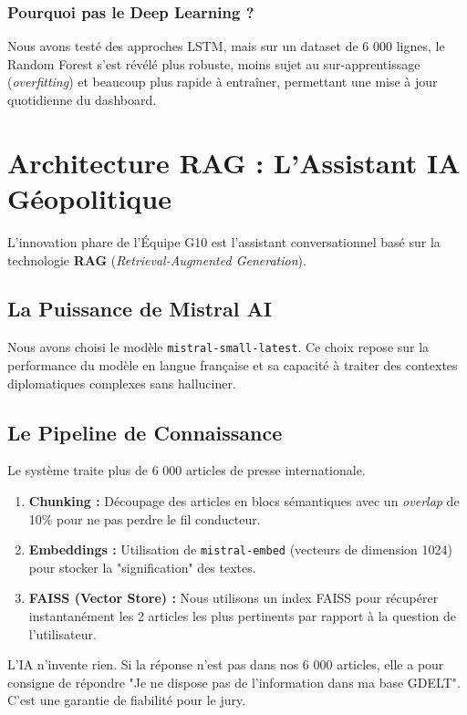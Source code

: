 \documentclass[12pt,a4paper]{article}
\begin{document}
\subsubsection{Pourquoi pas le Deep Learning ?}
Nous avons testé des approches LSTM, mais sur un dataset de 6 000 lignes, le Random Forest s'est révélé plus robuste, moins sujet au sur-apprentissage (\textit{overfitting}) et beaucoup plus rapide à entraîner, permettant une mise à jour quotidienne du dashboard.

\section{Architecture RAG : L'Assistant IA Géopolitique}
L'innovation phare de l'Équipe G10 est l'assistant conversationnel basé sur la technologie \textbf{RAG} (\textit{Retrieval-Augmented Generation}).

\subsection{La Puissance de Mistral AI}
Nous avons choisi le modèle \texttt{mistral-small-latest}. Ce choix repose sur la performance du modèle en langue française et sa capacité à traiter des contextes diplomatiques complexes sans halluciner. 

\subsection{Le Pipeline de Connaissance}
Le système traite plus de 6 000 articles de presse internationale. 
\begin{enumerate}
    \item \textbf{Chunking :} Découpage des articles en blocs sémantiques avec un \textit{overlap} de 10\% pour ne pas perdre le fil conducteur.
    \item \textbf{Embeddings :} Utilisation de \texttt{mistral-embed} (vecteurs de dimension 1024) pour stocker la "signification" des textes.
    \item \textbf{FAISS (Vector Store) :} Nous utilisons un index FAISS pour récupérer instantanément les 2 articles les plus pertinents par rapport à la question de l'utilisateur.
\end{enumerate}

\begin{tcolorbox}[colback=white, colframe=darkblue, title=Sécurité et Précision]
    L'IA n'invente rien. Si la réponse n'est pas dans nos 6 000 articles, elle a pour consigne de répondre "Je ne dispose pas de l'information dans ma base GDELT". C'est une garantie de fiabilité pour le jury.
\end{tcolorbox}
\end{document}
